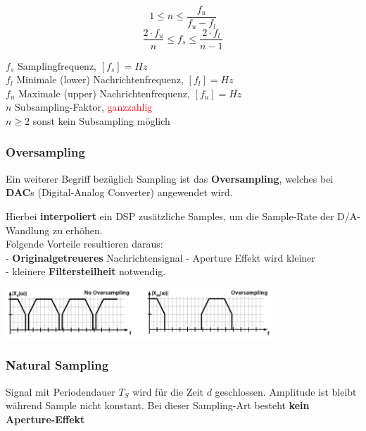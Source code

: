 \begin{minipage}[t][2cm][c]{10cm}
$$ 1 \leq n \leq \frac{f_u}{f_u - f_l} $$
$$ \frac{2 \cdot f_u}{n} \leq f_s \leq \frac{2 \cdot f_l}{n-1}$$
\end{minipage}
\begin{minipage}[t][2cm][c]{8cm}
	$f_s$ Samplingfrequenz, $[f_s] = Hz$ \\
	$f_l$ Minimale (lower) Nachrichtenfrequenz, $[f_l] = Hz$ \\
	$f_u$ Maximale (upper) Nachrichtenfrequenz, $[f_u] = Hz$ \\
	$n$ Subsampling-Faktor, \textcolor{red}{ganzzahlig} \\
	$n \geq 2$ sonst kein Subsampling möglich \\
\end{minipage}

\subsubsection{Oversampling}
Ein weiterer Begriff bezüglich Sampling ist das \textbf{Oversampling}, welches bei \textbf{DAC}s
(Digital-Analog Converter) angewendet wird. \\
	\begin{minipage}{9cm}
		Hierbei \textbf{interpoliert} ein DSP zusätzliche Samples, um die Sample-Rate der D/A-Wandlung zu erhöhen.\\
		Folgende Vorteile resultieren daraus:\\ 
		- \textbf{Originalgetreueres} Nachrichtensignal
		- Aperture Effekt wird kleiner\\
		- kleinere
		\textbf{Filtersteilheit} notwendig.
	\end{minipage}
	\begin{minipage}{10cm}
		\includegraphics[width=10cm]{bilder/dig_oversampling.png}
	\end{minipage}

\subsubsection{Natural Sampling }
Signal mit Periodendauer $T_S$ wird für die Zeit $d$ geschlossen. Amplitude ist bleibt
während Sample nicht konstant. Bei dieser Sampling-Art besteht \textbf{kein Aperture-Effekt}\\

